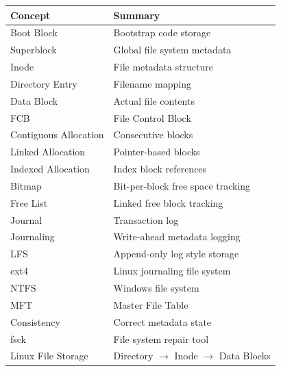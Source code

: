 \begin{longtable}{|p{5cm}|p{8cm}|}
\hline
Concept & Summary \\
\hline
Boot Block & Bootstrap code storage \\
\hline
Superblock & Global file system metadata \\
\hline
Inode & File metadata structure \\
\hline
Directory Entry & Filename mapping \\
\hline
Data Block & Actual file contents \\
\hline
FCB & File Control Block \\
\hline
Contiguous Allocation & Consecutive blocks \\
\hline
Linked Allocation & Pointer-based blocks \\
\hline
Indexed Allocation & Index block references \\
\hline
Bitmap & Bit-per-block free space tracking \\
\hline
Free List & Linked free block tracking \\
\hline
Journal & Transaction log \\
\hline
Journaling & Write-ahead metadata logging \\
\hline
LFS & Append-only log style storage \\
\hline
ext4 & Linux journaling file system \\
\hline
NTFS & Windows file system \\
\hline
MFT & Master File Table \\
\hline
Consistency & Correct metadata state \\
\hline
fsck & File system repair tool \\
\hline
Linux File Storage & Directory $\rightarrow$ Inode $\rightarrow$ Data Blocks \\
\hline
\end{longtable}